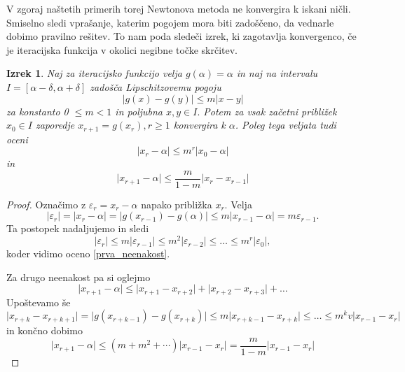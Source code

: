 \documentclass[12pt,a4paper]{amsart}
\theoremstyle{definition} %
\theoremstyle{plain} %
\newtheorem{izrek}[definicija]{Izrek}
\begin{document}
V zgoraj naštetih primerih torej Newtonova metoda ne konvergira k iskani ničli. Smiselno sledi vprašanje, katerim pogojem mora biti zadoščeno, da 
vednarle dobimo pravilno rešitev. To nam poda sledeči izrek, ki zagotavlja konvergenco, če je iteracijska funkcija v okolici negibne točke skrčitev.
\begin{izrek} 
    Naj za iteracijsko funkcijo velja $g(\alpha) = \alpha$ in naj na intervalu $I = [ \alpha - \delta,\alpha + \delta ]$ zadošča Lipschitzovemu pogoju
    \[
        \lvert g(x) - g(y) \rvert \leq m \lvert x - y \rvert
    \]
    za konstanto 0 $\leq m < 1$ in poljubna $x,y \in I.$ Potem za vsak začetni približek $x_{0} \in I$ zaporedje $x_{r+1} = g(x_{r}), r \geq 1$ konvergira k $\alpha$. Poleg tega veljata
    tudi oceni
    \begin{equation}\label{prva_neenakost}
        \lvert x_{r} - \alpha \rvert \leq m^{r}\lvert x_{0} - \alpha \rvert
    \end{equation}
    in
    \begin{equation}
        \lvert x_{r+1} - \alpha \rvert \leq \frac{m}{1-m} \lvert x_{r} - x_{r-1} \rvert
    \end{equation}
\end{izrek}
\begin{proof}
    Označimo z $\varepsilon_{r} = x_{r} - \alpha $ napako približka $x_{r}.$ Velja
    \[
        \lvert \varepsilon_{r} \rvert = \lvert x_{r} - \alpha \rvert = \lvert g(x_{r-1}) - g(\alpha) \rvert \leq m\lvert x_{r-1} - \alpha \rvert = m \varepsilon_{r-1}.
    \]
    Ta postopek nadaljujemo in sledi
    \[
        \lvert \varepsilon_{r} \rvert \leq m \lvert \varepsilon_{r-1} \rvert \leq m^{2} \lvert \varepsilon_{r-2} \rvert \leq \ldots \leq m^{r} \lvert\varepsilon_{0} \rvert,
    \]
    koder vidimo oceno \eqref{prva_neenakost}.

    Za drugo neenakost pa si oglejmo
    \[
        \lvert x_{r+1} - \alpha \rvert \leq \lvert x_{r+1} - x_{r+2} \rvert + \lvert x_{r+2} - x_{r+3} \rvert + \ldots
    \]
    Upoštevamo še
    \[
        \lvert x_{r+k} - x_{r+k+1} \rvert = \lvert g(x_{r+k-1}) - g(x_{r+k}) \rvert \leq m \lvert x_{r+k-1} - x_{r+k} \rvert \leq \ldots \leq m^{k}v\lvert x_{r-1} - x_{r}\rvert 
    \]
    in končno dobimo
    \[
        \lvert x_{r+1} - \alpha\rvert \leq (m + m^2 + \cdots)\lvert x_{r-1} - x_{r}\rvert = \frac{m}{1-m}\lvert x_{r-1} - x_{r}\rvert
    \]
\end{proof}
\end{document}
